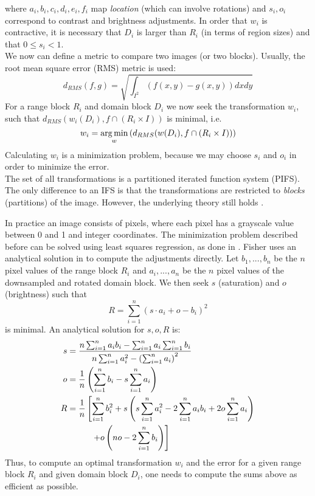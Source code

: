 where $a_i, b_i, c_i, d_i, e_i, f_i$ map \textit{location} (which can involve rotations) and $s_i, o_i$ correspond to contrast and brightness adjustments.
In order that $w_i$ is contractive, it is necessary that $D_i$ is larger than $R_i$ (in terms of region sizes) and that $0 \leq s_i < 1$.
\\
We now can define a metric to compare two images (or two blocks). Usually, the root mean square error (RMS) metric is used:
$$
d_{RMS}(f,g) = \sqrt{\int_{I^2} (f(x,y)-g(x,y))dxdy}
$$
For a range block $R_i$ and domain block $D_i$ we now seek the transformation $w_i$, such that $d_{RMS}(w_i(D_i), f \cap (R_i \times I))$ is minimal, i.e.
$$
    w_i = \operatorname*{arg\,min}_{w} \left( d_{RMS}(w(D_i), f \cap (R_i \times I)) \right)
$$
Calculating $w_i$ is a minimization problem, because we may choose $s_i$ and $o_i$ in order to minimize the error.\\
The set of all transformations is a partitioned iterated function system (PIFS). The only difference to an IFS is that the transformations are restricted
to \textit{blocks} (partitions) of the image. However, the underlying theory still holds \cite{fisher2012}.

 \label{par-practical-implementation}
In practice an image consists of pixels, where each pixel has a grayscale value between 0 and 1 and integer coordinates.
The minimization problem described before can be solved using least squares regression, as done in \cite{github-python}.
Fisher uses an analytical solution in \cite{fisher2012} to compute the adjustments directly. Let $b_1, ..., b_n$ be the $n$ pixel values of the range block $R_i$
and $a_i,...,a_n$ be the $n$ pixel values of the downsampled and rotated domain block. We then seek $s$ (saturation) and $o$ (brightness) such that
$$
R = \sum_{i=1}^n (s \cdot a_i + o - b_i)^2
$$
is minimal. An analytical solution for $s,o,R$ is:
\begin{align}
    s &= \frac{n \sum_{i=1}^n a_i b_i - \sum_{i=1}^n a_i \sum_{i=1}^n b_i}{n \sum_{i=1}^n a_i^2 - \left(\sum_{i=1}^n a_i \right)^2} \label{contrast}\\
    o &= \frac{1}{n} \left( \sum_{i=1}^n b_i - s \sum_{i=1}^n a_i \right) \label{brightness}\\
    R &= \frac{1}{n} \left[ \sum_{i=1}^n b_i^2 + s \left( s \sum_{i=1}^n a_i^2 - 2 \sum_{i=1}^n a_i b_i + 2o \sum_{i=1}^n a_i \right) \right. \notag\\
    &\text{\hspace{1cm}} \left. + o \left(no - 2 \sum_{i=1}^n b_i \right)  \right]\label{error}
    \end{align}
Thus, to compute an optimal transformation $w_i$ and the error for a given range block $R_i$ and given domain block $D_i$, one needs to compute the sums above
as efficient as possible.

